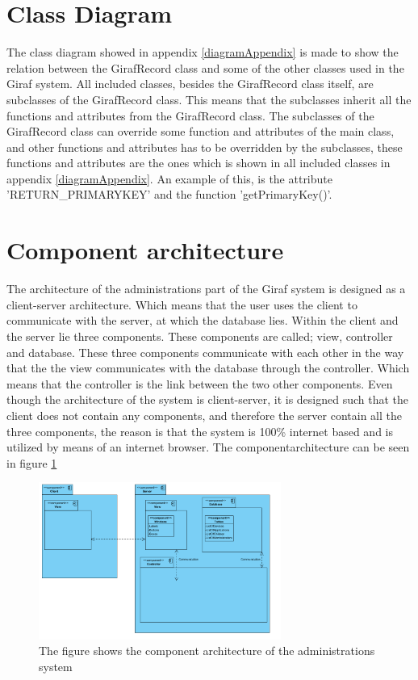 \section{Class Diagram}

The class diagram showed in appendix \ref{diagramAppendix} is made to show the relation between the GirafRecord class and some of the other classes used in the Giraf system.
All included classes, besides the GirafRecord class itself, are subclasses of the GirafRecord class. This means that the subclasses inherit all the functions and attributes from the GirafRecord class.
The subclasses of the GirafRecord class can override some function and attributes of the main class, and other functions and attributes has to be overridden by the subclasses, these functions and attributes are the ones which is shown in all included classes in appendix \ref{diagramAppendix}.
An example of this, is the attribute 'RETURN\_PRIMARYKEY' and the function 'getPrimaryKey()'.
   
\section{Component architecture}

The architecture of the administrations part of the Giraf system is designed as a client-server architecture. Which means that the user uses the client to communicate with the server, at which the database lies. Within the client and the server lie three components. These components are called; view, controller and database. These three components communicate with each other in the way that the the view communicates with the database through the controller. Which means that the controller is the link between the two other components. Even though the architecture of the system is client-server, it is designed such that the client does not contain any components, and therefore the server contain all the three components, the reason is that the system is 100\% internet based and is utilized by means of an internet browser. The componentarchitecture can be seen in figure \ref{fig:architecture}

\begin{figure}[!ht]
\centering
\includegraphics[width=300px]{img/ComponentArketektur.png}
\caption{The figure shows the component architecture of the administrations system}
\label{fig:architecture}
\end{figure}

